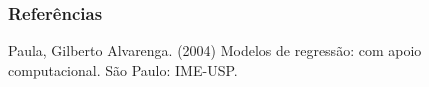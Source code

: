 \documentclass{beamer}
\begin{document}





\begin{frame}
\frametitle{Referências}
\footnotesize{
\begin{thebibliography}{99} %
\justifying


Paula, Gilberto Alvarenga. (2004) Modelos de regressão: com apoio computacional. São Paulo: IME-USP.

\end{thebibliography}
}




\end{frame}

\end{document}
